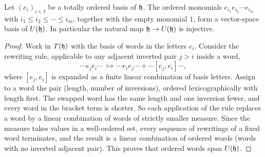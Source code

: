\begin{theorem}\label{thm:pbw}
Let $(e_i)_{i\in I}$ be a totally ordered basis of $\mathfrak{h}$. The ordered
monomials $e_{i_1}e_{i_2}\cdots e_{i_m}$ with $i_1\leq i_2\leq\cdots\leq i_m$,
together with the empty monomial $1$, form a vector-space basis of $U(\mathfrak{h})$.
In particular the natural map $\mathfrak{h}\to U(\mathfrak{h})$ is injective.
\end{theorem}
\begin{proof}
Work in $T(\mathfrak{h})$ with the basis of words in the letters $e_i$. Consider the
rewriting rule, applicable to any adjacent inverted pair $j>i$ inside a
word,
\begin{equation}\label{eq:rewrite}
 \cdots e_je_i\cdots\ \longmapsto\ \cdots e_ie_j\cdots+\cdots[e_j,e_i]\cdots,
\end{equation}
where $[e_j,e_i]$ is expanded as a finite linear combination of basis
letters. Assign to a word the pair (length, number of inversions), ordered
lexicographically with length first. The swapped word has the same length
and one inversion fewer, and every word in the bracket term is shorter. So
each application of the rule replaces a word by a linear combination of
words of strictly smaller measure. Since the measure takes values in a
well-ordered set, every sequence of rewritings of a fixed word terminates,
and the result is a linear combination of ordered words (words with no
inverted adjacent pair). This proves that ordered words span $U(\mathfrak{h})$.


\end{proof}
